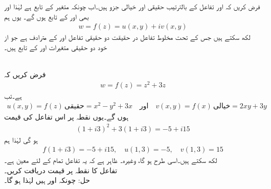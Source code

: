 فرض کریں کہ  اور  تفاعل  کے بالترتیب حقیقی اور خیالی جزو ہیں۔اب چونکہ  متغیر  کے تابع ہے لہٰذا   اور  بھی  اور  کے تابع ہوں گے۔ یوں ہم
\begin{align*}
w=f(z)=u(x,y)+iv(x,y)
\end{align*}
لکھ سکتے ہیں جس کے تحت مخلوط تفاعل  در حقیقت دو حقیقی تفاعل  اور  کے مترادف ہے جو  از خود دو حقیقی متغیرات  اور  کے تابع ہیں۔

\quad {}\\
فرض کریں کہ
\begin{align*}
w=f(z)=z^2+3z
\end{align*}
ہے۔تب 
\begin{align*}
u(x,y)=f(z)\,\text{حقیقی}=x^2-y^2+3x\quad \text{اور}\quad v(x,y)=f(x)\,\text{خیالی}=2xy+3y
\end{align*}
ہوں گے۔یوں نقطہ  پر اس تفاعل کی قیمت
\begin{align*}
(1+i3)^2+3(1+i3)=-5+i15
\end{align*}
ہو گی لہٰذا ہم
\begin{align*}
f(1+i3)=-5+i15,\quad u(1,3)=-5,\quad v(1,3)=15
\end{align*}
لکھ سکتے ہیں۔اسی طرح  ہو گا، وغیرہ۔ ظاہر ہے کہ یہ تفاعل تمام  کے لئے معین ہے۔
\quad {}\\
تفاعل   کا نقطہ  پر قیمت دریافت کریں۔\\
حل:\quad
چونکہ  اور  ہیں لہٰذا  ہو گا۔

